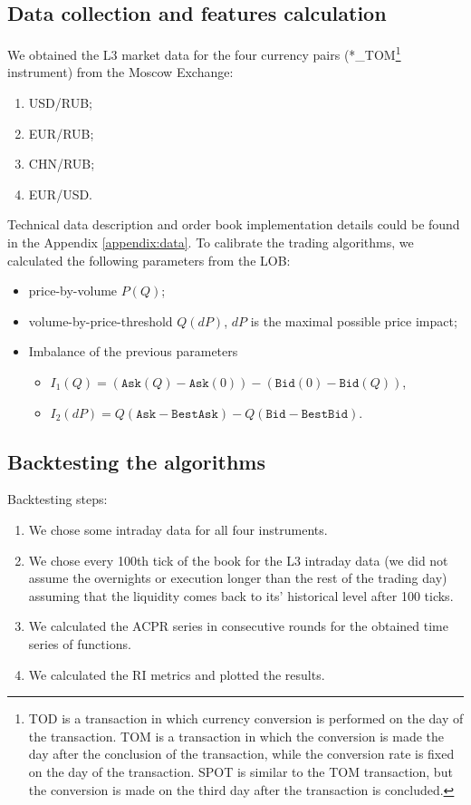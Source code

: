     \subsection{Data collection and features calculation}
        We obtained the L3 market data for the four currency pairs (*\_TOM\footnote{TOD is a transaction in which currency conversion is performed on the day of the transaction.
        TOM is a transaction in which the conversion is made the day after the conclusion of the transaction, while the conversion rate is fixed on the day of the transaction.
        SPOT is similar to the TOM transaction, but the conversion is made on the third day after the transaction is concluded.} instrument) from the Moscow Exchange:
        \begin{enumerate}
            \item USD/RUB; 
            \item EUR/RUB; 
            \item CHN/RUB;
            \item EUR/USD.
        \end{enumerate} 
        Technical data description and order book implementation details could be found in the Appendix \ref{appendix:data}.
        To calibrate the trading algorithms, we calculated the following parameters from the LOB:
        \begin{itemize}
            \item price-by-volume $P(Q)$;
            \item volume-by-price-threshold $Q(dP)$, $dP$ is the maximal possible price impact;
            \item Imbalance of the previous parameters\begin{itemize}
                \item $I_1(Q) = (\texttt{Ask}(Q) - \texttt{Ask}(0)) - (\texttt{Bid}(0) - \texttt{Bid}(Q))$,
                \item $I_2(dP) = Q(\texttt{Ask} - \texttt{BestAsk}) - Q(\texttt{Bid} - \texttt{BestBid})$.
            \end{itemize}
        \end{itemize}

    \subsection{Backtesting the algorithms}
        Backtesting steps:
        \begin{enumerate}
            \item We chose some intraday data for all four instruments.
            \item We chose every 100th tick of the book for the L3 intraday data (we did not assume the overnights or execution longer than the rest of the trading day) assuming that the liquidity comes back to its' historical level after 100 ticks.
            \item We calculated the ACPR series in consecutive rounds for the obtained time series of functions.
            \item We calculated the RI metrics and plotted the results.
        \end{enumerate}

